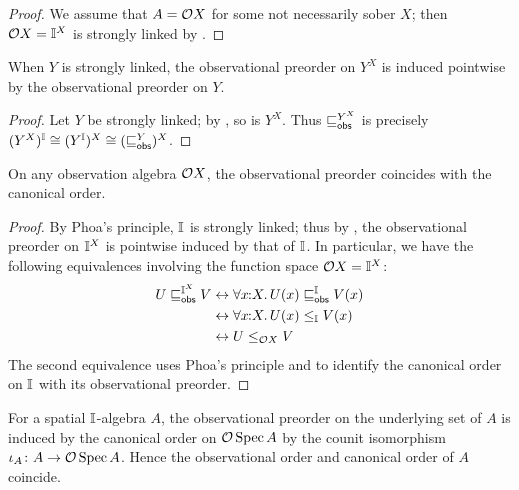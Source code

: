 \begin{proof}
  We assume that $A=\mathcal{O}{X}$ for some not necessarily sober $X$; then $\mathcal{O}{X}=\mathbb{I}^X$ is strongly linked by .
\end{proof}


\begin{corollary}\label{cor:strong-link-obs-pw}
  When $Y$ is strongly linked, the observational preorder on $Y^X$ is induced pointwise by the observational preorder on $Y$.
\end{corollary}

\begin{proof}
  Let $Y$ be strongly linked; by , so is $Y^X$. Thus $\obsle[Y^X]$ is precisely $(Y^X)^\I\cong (Y^\I)^X\cong (\obsle[Y])^X$.
\end{proof}

\begin{proposition}[\AxiomSQCP]\label{prop:specordopens}
  On any observation algebra $\mathcal{O}{X}$, the observational preorder coincides with the canonical order.
\end{proposition}

\begin{proof}
  By Phoa's principle, $\mathbb{I}$ is strongly linked; thus by , the observational preorder on $\mathbb{I}^X$ is pointwise induced by that of $\mathbb{I}$. In particular, we have the following equivalences involving the function space $\mathcal{O}{X}=\mathbb{I}^X$:
  \begin{align*}
    U\obsle[\I^X]V 
    &\eq \fa{x}{X} U(x)\obsle[\I] V(x)
    \\
    &\eq \fa{x}{X} U(x)\le_{\I} V(x)
    \\
    &\eq U\le_{\opens{X}} V \qedhere
  \end{align*}
  The second equivalence uses Phoa's principle and  to identify the canonical order on $\mathbb{I}$ with its observational preorder.
% 
\end{proof}

\begin{proposition}[\AxiomSQCP]\label{cor:specordonalgiscan}
  For a spatial $\mathbb{I}$-algebra $A$, the observational preorder on the underlying set of $A$ is induced by the canonical order on $\mathcal{O}\operatorname{Spec}{A}$ by the counit isomorphism $\iota_A\colon A\to \mathcal{O}\operatorname{Spec}{A}$. Hence the observational order and canonical order of $A$ coincide.
\end{proposition}

